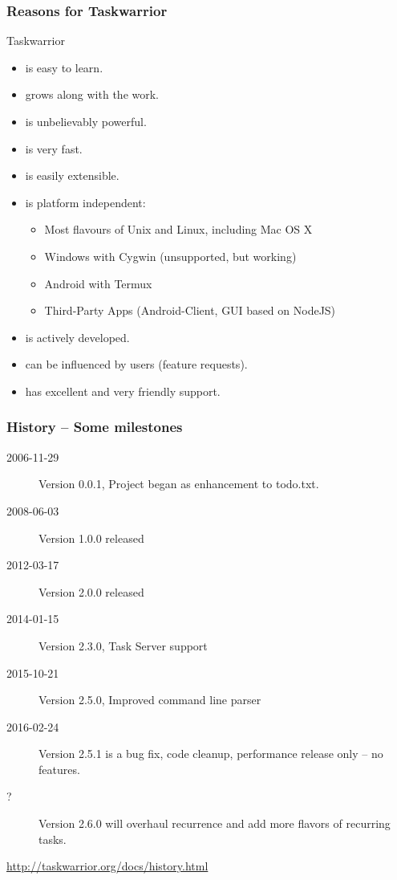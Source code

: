 \documentclass[t,handout]{beamer}
\begin{document}
\begin{frame}[fragile]\frametitle{Reasons for Taskwarrior}
Taskwarrior
\begin{itemize}
	\item is easy to learn.
	\item grows along with the work.
	\item is unbelievably powerful.
	\item is very fast.
	\item is easily extensible.
	\item is platform independent:
	\begin{itemize}
		\item Most flavours of Unix and Linux, including Mac OS X
        \item Windows with Cygwin (unsupported, but working)
		\item Android with Termux
        \item Third-Party Apps (Android-Client, GUI based on NodeJS)
	\end{itemize}
	\item is actively developed.
	\item can be influenced by users (feature requests).
	\item has excellent and very friendly support.
\end{itemize}
\end{frame}

\begin{frame}[fragile]\frametitle{History -- Some milestones}
    \begin{description}
        \item[2006-11-29] Version 0.0.1, Project began as enhancement to todo.txt.
        \item[2008-06-03] Version 1.0.0 released
        \item[2012-03-17] Version 2.0.0 released
        \item[2014-01-15] Version 2.3.0, Task Server support
        \item[2015-10-21] Version 2.5.0, Improved command line parser
        \item[2016-02-24] Version 2.5.1 is a bug fix, code cleanup, performance release only -- no features.
        \item[?]          Version 2.6.0 will overhaul recurrence and add more flavors of recurring tasks.
    \end{description}

    \url{http://taskwarrior.org/docs/history.html}
\end{frame}
\end{document}
